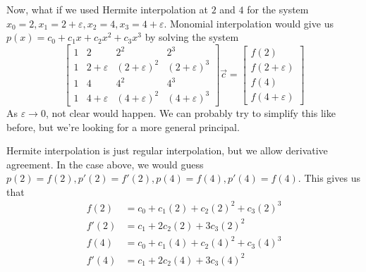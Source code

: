 \documentclass{article}
\theoremstyle{plain}
\theoremstyle{remark}
\newcommand{\ep}{{\varepsilon}}
\begin{document}
Now, what if we used Hermite interpolation at $2$ and $4$ for the system
$x_0 = 2, x_1 = 2+ \ep, x_2 = 4, x_3 = 4 + \ep$.
Monomial interpolation would give us
$p(x) = c_0 + c_1x + c_2x^2 + c_3x^3$ by solving the system
\[
	\begin{bmatrix}
		1 & 2 & 2^2 & 2^3\\
		1 & 2 + \ep & (2+\ep)^2 & (2+\ep)^3\\
		1 & 4 & 4^2 & 4^3\\
		1 & 4 + \ep & (4+\ep)^2 & (4+\ep)^3
	\end{bmatrix}
	\vec{c} =
	\begin{bmatrix} f(2) \\ f(2+\ep) \\ f(4) \\ f(4+\ep) \end{bmatrix}
\]
As $\ep \to 0$, not clear would happen.
We can probably try to simplify this like before,
but we're looking for a more general principal.

Hermite interpolation is just regular interpolation,
but we allow derivative agreement.
In the case above, we would guess $p(2) = f(2), p'(2) = f'(2), p(4) = f(4), p'(4) = f(4)$.
This gives us that
\begin{align*}
	f(2) &= c_0 + c_1(2) + c_2(2)^2 + c_3(2)^3\\
	f'(2) &= c_1 + 2c_2(2) + 3c_3(2)^2\\
	f(4) &= c_0 + c_1(4) + c_2(4)^2 + c_3(4)^3\\
	f'(4) &= c_1 + 2c_2(4) + 3c_3(4)^2\\
\end{align*}
\end{document}
